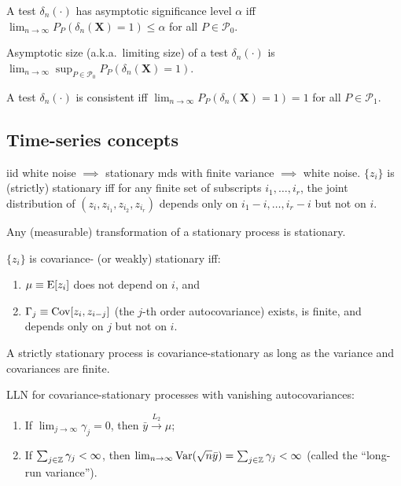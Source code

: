 \documentclass[8pt,letterpaper, landscape]{extarticle} %
\newcommand{\mX}{\ensuremath{\mathbf{X}}}
\begin{document}
\begin{multicols}{3}
\begin{description}
 A test $ \delta_n (\cdot) $ has asymptotic significance level $ \alpha $ iff $ \lim_{n \to \infty} P_P (\delta_n (\mX) = 1) \leq \alpha $ for all $ P \in \mathcal{P}_0 $.

 Asymptotic size (a.k.a.\ limiting size) of a test $ \delta_n (\cdot) $ is $ \lim_{n \to \infty} \sup_{P \in \mathcal{P}_0} P_P (\delta_n (\mX) = 1) $.

 A test $ \delta_n (\cdot) $ is consistent iff $ \lim_{n \to \infty} P_P (\delta_n (\mX) = 1) = 1 $ for all $ P \in \mathcal{P}_1 $.

\subsection{Time-series concepts}
iid white noise $ \implies $ stationary mds with finite variance $ \implies $ white noise.
 $ \{ z_i \} $ is (strictly) stationary iff for any finite set of subscripts $ i_1, \dotsc , i_r $, the joint distribution of $ ( z_i , z_{i_{1}}, z_{i_{2}},  z_{i_{r}} ) $ depends only on $ i_1 - i, \dotsc , i_r - i $ but not on $ i $.

Any (measurable) transformation of a stationary process is stationary.

 $ \{ z_i \} $ is covariance- (or weakly) stationary iff:
\begin{enumerate}
\item $ \mu \equiv \operatorname{E} [z_i] $ does not depend on $ i $, and
\item $ \Gamma_{j} \equiv \operatorname{Cov} [z_i , z_{i-j} ] $ (the $ j $-th order autocovariance) exists, is finite, and depends only on $ j $ but not on $ i $.
\end{enumerate}

A strictly stationary process is covariance-stationary as long as the variance and covariances are finite.

LLN for covariance-stationary processes with vanishing autocovariances:
\begin{enumerate}
\item If $ \lim_{j \to \infty} \gamma_{j} = 0 $, then $ \bar{y} \xrightarrow{L_2} \mu $;
\item If $ \sum_{j \in \mathbb{Z}} \gamma_j < \infty $, then $ \lim_{n \to \infty} \operatorname{Var} (\sqrt{n} \bar{y}) = \sum_{j \in \mathbb{Z}} \gamma_j < \infty $ (called the ``long-run variance'').
\end{enumerate}


\end{description}
\end{multicols}
\end{document}
